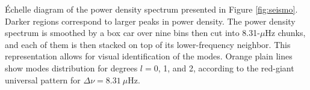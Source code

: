 \label{fig:echelle} \'Echelle diagram of the power density spectrum presented in Figure \ref{fig:seismo}. Darker regions correspond to larger peaks in power density. The power density spectrum is smoothed by a box car over nine bins then cut into 8.31-$\mu$Hz chunks, and each of them is then stacked on top of its lower-frequency neighbor. This representation allows for visual identification of the modes. Orange plain lines show modes distribution for degrees $l = 0$, 1, and 2, according to the red-giant universal pattern for $\Delta\nu = 8.31\ \mu$Hz.
  
  